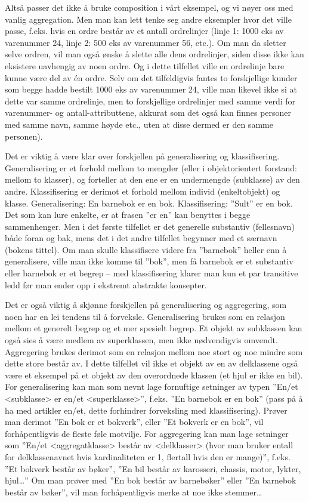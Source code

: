 Altså passer det ikke å bruke composition i vårt eksempel, og vi nøyer oss med vanlig aggregation. Men man kan lett tenke seg andre eksempler hvor det ville passe, f.eks. hvis en ordre består av et antall ordrelinjer (linje 1: 1000 eks av varenummer 24, linje 2: 500 eks av varenummer 56, etc.). Om man da sletter selve ordren, vil man også ønske å slette alle dens ordrelinjer, siden disse ikke kan eksistere uavhengig av noen ordre. Og i dette tilfellet ville en ordrelinje bare kunne være del av én ordre. Selv om det tilfeldigvis fantes to forskjellige kunder som begge hadde bestilt 1000 eks av varenummer 24, ville man likevel ikke si at dette var samme ordrelinje, men to forskjellige ordrelinjer med samme verdi for varenummer- og antall-attributtene, akkurat som det også kan finnes personer med samme navn, samme høyde etc., uten at disse dermed er den samme personen).

Det er viktig å være klar over forskjellen på generalisering og klassifisering. Generalisering er et forhold mellom to mengder (eller i objektorientert forstand: mellom to klasser), og forteller at den ene er en undermengde (subklasse) av den andre. Klassifisering er derimot et forhold mellom individ (enkeltobjekt) og klasse. Generalisering: En barnebok er en bok. Klassifisering: ”Sult” er en bok. Det som kan lure enkelte, er at frasen ”er en” kan benyttes i begge sammenhenger. Men i det første tilfellet er det generelle substantiv (fellesnavn) både foran og bak, mens det i det andre tilfellet begynner med et særnavn (bokens tittel). Om man skulle klassifisere videre fra ”barnebok” heller enn å generalisere, ville man ikke komme til ”bok”, men få barnebok er et substantiv eller barnebok er et begrep – med klassifisering klarer man kun et par transitive ledd før man ender opp i ekstremt abstrakte konsepter.

Det er også viktig å skjønne forskjellen på generalisering og aggregering, som noen har en lei tendens til å forveksle. Generalisering brukes som en relasjon mellom et generelt begrep og et mer spesielt begrep. Et objekt av subklassen kan også sies å være medlem av superklassen, men ikke nødvendigvis omvendt. Aggregering brukes derimot som en relasjon mellom noe stort og noe mindre som dette store består av. I dette tilfellet vil ikke et objekt av en av delklassene også være et eksempel på et objekt av den overordnede klassen (et hjul er ikke en bil). For generalisering kan man som nevnt lage fornuftige setninger av typen ”En/et <subklasse> er en/et <superklasse>”, f.eks. ”En barnebok er en bok” (pass på å ha med artikler en/et, dette forhindrer forveksling med klassifisering). Prøver man derimot ”En bok er et bokverk”, eller ”Et bokverk er en bok”, vil forhåpentligvis de fleste føle motvilje. For aggregering kan man lage setninger som ”En/et <aggregatklasse> består av <delklasser> (hvor man bruker entall for delklassenavnet hvis kardinaliteten er 1, flertall hvis den er mange)”, f.eks. ”Et bokverk består av bøker”, ”En bil består av karosseri, chassis, motor, lykter, hjul…” Om man prøver med ”En bok består av barnebøker” eller ”En barnebok består av bøker”, vil man forhåpentligvis merke at noe ikke stemmer…

